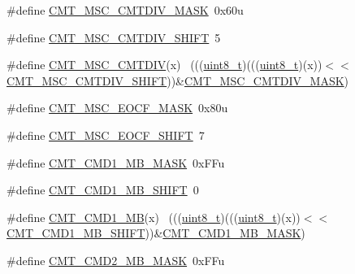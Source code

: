 \begin{DoxyCompactItemize}
\#define \hyperlink{group___c_m_t___register___masks_gab663f14909462192c6e432c7bd0e56bf}{C\+M\+T\+\_\+\+M\+S\+C\+\_\+\+C\+M\+T\+D\+I\+V\+\_\+\+M\+A\+SK}~0x60u
\item 
\#define \hyperlink{group___c_m_t___register___masks_gad2d262cf3ba8ccd189bd321219579c52}{C\+M\+T\+\_\+\+M\+S\+C\+\_\+\+C\+M\+T\+D\+I\+V\+\_\+\+S\+H\+I\+FT}~5
\item 
\#define \hyperlink{group___c_m_t___register___masks_ga54610d66d9610fc9d93f47c16a2f052a}{C\+M\+T\+\_\+\+M\+S\+C\+\_\+\+C\+M\+T\+D\+IV}(x)                                            ~(((\hyperlink{_p_e___types_8h_aba7bc1797add20fe3efdf37ced1182c5}{uint8\+\_\+t})(((\hyperlink{_p_e___types_8h_aba7bc1797add20fe3efdf37ced1182c5}{uint8\+\_\+t})(x))$<$$<$\hyperlink{group___c_m_t___register___masks_gad2d262cf3ba8ccd189bd321219579c52}{C\+M\+T\+\_\+\+M\+S\+C\+\_\+\+C\+M\+T\+D\+I\+V\+\_\+\+S\+H\+I\+FT}))\&\hyperlink{group___c_m_t___register___masks_gab663f14909462192c6e432c7bd0e56bf}{C\+M\+T\+\_\+\+M\+S\+C\+\_\+\+C\+M\+T\+D\+I\+V\+\_\+\+M\+A\+SK})
\item 
\#define \hyperlink{group___c_m_t___register___masks_ga1aec1fa9b79d496b3f5f32fab07495a3}{C\+M\+T\+\_\+\+M\+S\+C\+\_\+\+E\+O\+C\+F\+\_\+\+M\+A\+SK}~0x80u
\item 
\#define \hyperlink{group___c_m_t___register___masks_gab505074d349c8d2c800e554a0893f312}{C\+M\+T\+\_\+\+M\+S\+C\+\_\+\+E\+O\+C\+F\+\_\+\+S\+H\+I\+FT}~7
\item 
\#define \hyperlink{group___c_m_t___register___masks_gae4b77d2880f04b69d33cacfe3978042a}{C\+M\+T\+\_\+\+C\+M\+D1\+\_\+\+M\+B\+\_\+\+M\+A\+SK}~0x\+F\+Fu
\item 
\#define \hyperlink{group___c_m_t___register___masks_ga8bbdd2644bc864f959170f9260981476}{C\+M\+T\+\_\+\+C\+M\+D1\+\_\+\+M\+B\+\_\+\+S\+H\+I\+FT}~0
\item 
\#define \hyperlink{group___c_m_t___register___masks_ga6768033295fb2ea10154824be36cb803}{C\+M\+T\+\_\+\+C\+M\+D1\+\_\+\+MB}(x)                                                  ~(((\hyperlink{_p_e___types_8h_aba7bc1797add20fe3efdf37ced1182c5}{uint8\+\_\+t})(((\hyperlink{_p_e___types_8h_aba7bc1797add20fe3efdf37ced1182c5}{uint8\+\_\+t})(x))$<$$<$\hyperlink{group___c_m_t___register___masks_ga8bbdd2644bc864f959170f9260981476}{C\+M\+T\+\_\+\+C\+M\+D1\+\_\+\+M\+B\+\_\+\+S\+H\+I\+FT}))\&\hyperlink{group___c_m_t___register___masks_gae4b77d2880f04b69d33cacfe3978042a}{C\+M\+T\+\_\+\+C\+M\+D1\+\_\+\+M\+B\+\_\+\+M\+A\+SK})
\item 
\#define \hyperlink{group___c_m_t___register___masks_gac9616164033684cd0d73e63eb6381441}{C\+M\+T\+\_\+\+C\+M\+D2\+\_\+\+M\+B\+\_\+\+M\+A\+SK}~0x\+F\+Fu

\end{DoxyCompactItemize}
